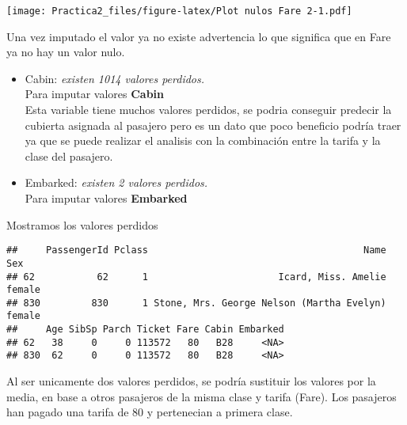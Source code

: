 \documentclass[]{article}
\newenvironment{Shaded}{\begin{snugshade}}{\end{snugshade}}
\newcommand{\KeywordTok}[1]{\textcolor[rgb]{0.13,0.29,0.53}{\textbf{#1}}}
\newcommand{\OperatorTok}[1]{\textcolor[rgb]{0.81,0.36,0.00}{\textbf{#1}}}
\newcommand{\NormalTok}[1]{#1}
\begin{document}
\texttt{[image: Practica2\_files/figure-latex/Plot nulos Fare 2-1.pdf]}

Una vez imputado el valor ya no existe advertencia lo que significa que
en Fare ya no hay un valor nulo.

\begin{itemize}
\item
  Cabin: \emph{existen 1014 valores perdidos.}\\
  Para imputar valores \textbf{Cabin}\\
  Esta variable tiene muchos valores perdidos, se podria conseguir
  predecir la cubierta asignada al pasajero pero es un dato que poco
  beneficio podría traer ya que se puede realizar el analisis con la
  combinación entre la tarifa y la clase del pasajero.
\item
  Embarked: \emph{existen 2 valores perdidos.}\\
  Para imputar valores \textbf{Embarked}
\end{itemize}

Mostramos los valores perdidos

\begin{Shaded}
\end{Shaded}

\begin{verbatim}
##     PassengerId Pclass                                      Name    Sex
## 62           62      1                       Icard, Miss. Amelie female
## 830         830      1 Stone, Mrs. George Nelson (Martha Evelyn) female
##     Age SibSp Parch Ticket Fare Cabin Embarked
## 62   38     0     0 113572   80   B28     <NA>
## 830  62     0     0 113572   80   B28     <NA>
\end{verbatim}

Al ser unicamente dos valores perdidos, se podría sustituir los valores
por la media, en base a otros pasajeros de la misma clase y tarifa
(Fare). Los pasajeros han pagado una tarifa de 80 y pertenecian a
primera clase.
\end{document}
